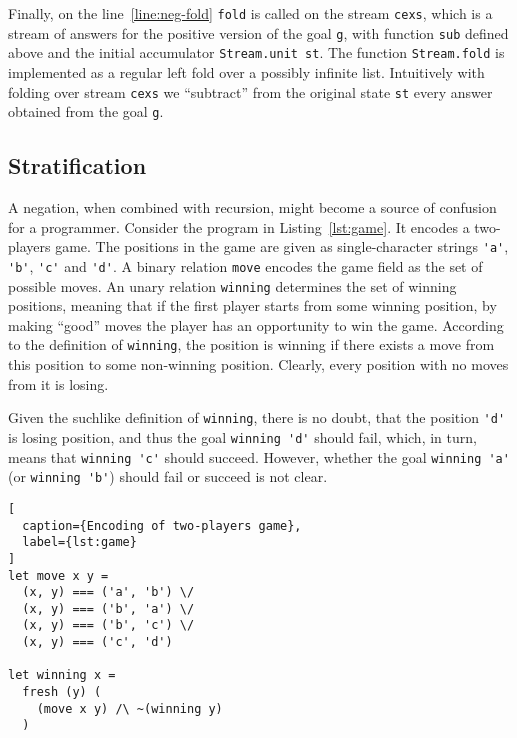 Finally, on the line~\ref{line:neg-fold}
\lstinline{fold} is called on the stream \lstinline{cexs},
which is a stream of answers for the positive version
of the goal \lstinline{g},
with function \lstinline{sub} defined above 
and the initial accumulator \lstinline{Stream.unit st}.
The function \lstinline{Stream.fold} is implemented
as a regular left fold over a possibly infinite list.
Intuitively with folding over stream \lstinline{cexs} 
we ``subtract'' from the original state \lstinline{st}
every answer obtained from the goal \lstinline{g}.
 
\subsection{Stratification}

\label{sec:strat}

A negation, when combined with recursion, 
might become a source of confusion for a programmer.
Consider the program in Listing~\ref{lst:game}.
It encodes a two-players game.
The positions in the game are given as 
single-character strings 
\lstinline{'a'}, \lstinline{'b'}, \lstinline{'c'} and \lstinline{'d'}.
A binary relation \lstinline{move} encodes 
the game field as the set of possible moves.
An unary relation \lstinline{winning} 
determines the set of winning positions,
meaning that if the first player
starts from some winning position, 
by making ``good'' moves the player has an 
opportunity to win the game.
According to the definition of \lstinline{winning},
the position is winning if there exists
a move from this position to some non-winning position.
Clearly, every position with no moves from it is losing.

Given the suchlike definition of \lstinline{winning},
there is no doubt, that the position \lstinline{'d'} 
is losing position,
and thus the goal \lstinline{winning 'd'} should fail,
which, in turn, means that \lstinline{winning 'c'} should succeed.
However, whether the goal \lstinline{winning 'a'} (or \lstinline{winning 'b'})
should fail or succeed is not clear.

\begin{minipage}{\textwidth}
\begin{lstlisting}[
  caption={Encoding of two-players game},
  label={lst:game}
]
let move x y = 
  (x, y) === ('a', 'b') \/
  (x, y) === ('b', 'a') \/
  (x, y) === ('b', 'c') \/
  (x, y) === ('c', 'd') 

let winning x = 
  fresh (y) (
    (move x y) /\ ~(winning y)
  )
\end{lstlisting}
\end{minipage}

